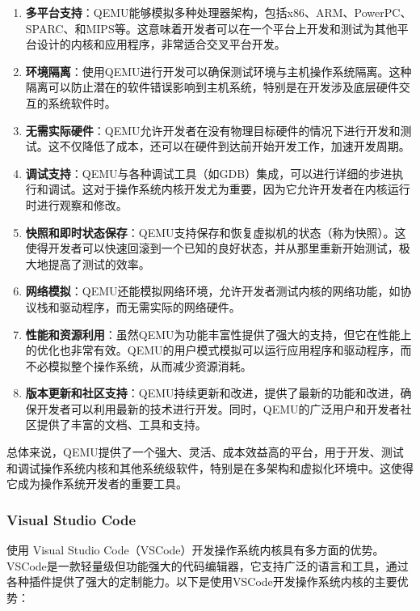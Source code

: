 \begin{enumerate}
    \item \textbf{多平台支持}：QEMU能够模拟多种处理器架构，包括x86、ARM、PowerPC、SPARC、和MIPS等。这意味着开发者可以在一个平台上开发和测试为其他平台设计的内核和应用程序，非常适合交叉平台开发。
    \item \textbf{环境隔离}：使用QEMU进行开发可以确保测试环境与主机操作系统隔离。这种隔离可以防止潜在的软件错误影响到主机系统，特别是在开发涉及底层硬件交互的系统软件时。
    \item \textbf{无需实际硬件}：QEMU允许开发者在没有物理目标硬件的情况下进行开发和测试。这不仅降低了成本，还可以在硬件到达前开始开发工作，加速开发周期。
    \item \textbf{调试支持}：QEMU与各种调试工具（如GDB）集成，可以进行详细的步进执行和调试。这对于操作系统内核开发尤为重要，因为它允许开发者在内核运行时进行观察和修改。
    \item \textbf{快照和即时状态保存}：QEMU支持保存和恢复虚拟机的状态（称为快照）。这使得开发者可以快速回滚到一个已知的良好状态，并从那里重新开始测试，极大地提高了测试的效率。
    \item \textbf{网络模拟}：QEMU还能模拟网络环境，允许开发者测试内核的网络功能，如协议栈和驱动程序，而无需实际的网络硬件。
    \item \textbf{性能和资源利用}：虽然QEMU为功能丰富性提供了强大的支持，但它在性能上的优化也非常有效。QEMU的用户模式模拟可以运行应用程序和驱动程序，而不必模拟整个操作系统，从而减少资源消耗。
    \item \textbf{版本更新和社区支持}：QEMU持续更新和改进，提供了最新的功能和改进，确保开发者可以利用最新的技术进行开发。同时，QEMU的广泛用户和开发者社区提供了丰富的文档、工具和支持。
\end{enumerate}

总体来说，QEMU提供了一个强大、灵活、成本效益高的平台，用于开发、测试和调试操作系统内核和其他系统级软件，特别是在多架构和虚拟化环境中。这使得它成为操作系统开发者的重要工具。

\subsubsection{Visual Studio Code}

使用 Visual Studio Code（VSCode）开发操作系统内核具有多方面的优势。VSCode是一款轻量级但功能强大的代码编辑器，它支持广泛的语言和工具，通过各种插件提供了强大的定制能力。以下是使用VSCode开发操作系统内核的主要优势：

